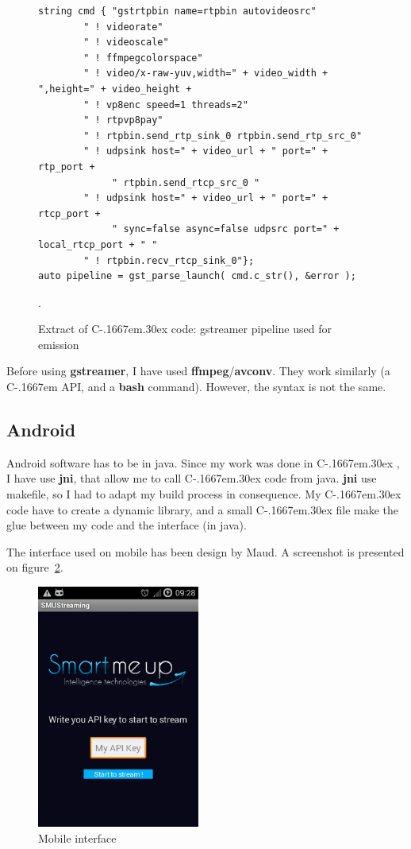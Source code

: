 \documentclass[a4paper,11pt]{custom}
\newcommand{\avconv}{\textbf{avconv}\xspace}
\newcommand{\ffmpeg}{\textbf{ffmpeg}\xspace}
\newcommand{\gstreamer}{\textbf{gstreamer}\xspace}
\newcommand{\jni}{\textbf{jni}\xspace}
\newcommand{\bash}{\textbf{bash}\xspace}
\newcommand{\cpp}{%
  C\kern-.1667em\raise.30ex\hbox{\smaller{++}\xspace}%
  \spacefactor1000%
}
\newcommand{\clang}{%
  C\kern-.1667em%
  \xspace%
}
\begin{document}
\begin{figure}
\begin{lstlisting}
string cmd { "gstrtpbin name=rtpbin autovideosrc"
        " ! videorate"
        " ! videoscale"
        " ! ffmpegcolorspace"
        " ! video/x-raw-yuv,width=" + video_width + ",height=" + video_height +
        " ! vp8enc speed=1 threads=2"
        " ! rtpvp8pay"
        " ! rtpbin.send_rtp_sink_0 rtpbin.send_rtp_src_0"
        " ! udpsink host=" + video_url + " port=" + rtp_port +
             " rtpbin.send_rtcp_src_0 "
        " ! udpsink host=" + video_url + " port=" + rtcp_port +
             " sync=false async=false udpsrc port=" + local_rtcp_port + " "
        " ! rtpbin.recv_rtcp_sink_0"};
auto pipeline = gst_parse_launch( cmd.c_str(), &error );
\end{lstlisting}
\label{fig:exctractcppcode}
\caption{Extract of \cpp code: gstreamer pipeline used for emission}.
\end{figure}

Before using \gstreamer, I have used \ffmpeg/\avconv. They work similarly (a
\clang API, and a \bash command). However, the syntax is not the same.

\subsection{Android}

Android software has to be in java. Since my work was done in \cpp, I have use
\jni, that allow me to call \cpp code from java. \jni use makefile, so I had to
adapt my build process in consequence. My \cpp code have to create a dynamic
library, and a small \cpp file make the glue between my code and the interface
(in java).

The interface used on mobile has been design by Maud. A screenshot is presented
on figure~\ref{fig:smumobile}.

\begin{figure}
\centering
\includegraphics[height=8cm]{smu_mobile.jpg}
\caption{Mobile interface}
\label{fig:smumobile}
\end{figure}
\end{document}

